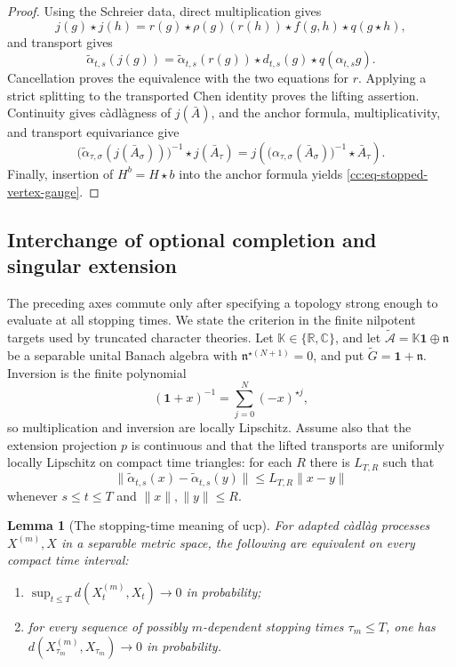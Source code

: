\documentclass[10pt,reqno]{amsart}
\theoremstyle{plain}
\newtheorem{lemma}[theorem]{Lemma}
\theoremstyle{definition}
\theoremstyle{remark}
\begin{document}
\begin{proof}
Using the Schreier data, direct multiplication gives
\[
 j(g)\star j(h)
 =r(g)\star\rho(g)(r(h))\star f(g,h)\star q(g\star h),
\]
and transport gives
\[
 \widetilde\alpha_{t,s}(j(g))
 =\widetilde\alpha_{t,s}(r(g))\star d_{t,s}(g)
  \star q(\alpha_{t,s}g).
\]
Cancellation proves the equivalence with the two equations for \(r\).
Applying a strict splitting to the transported Chen identity proves the
lifting assertion.  Continuity gives càdlàgness of \(j(\bar A)\), and
the anchor formula, multiplicativity, and transport equivariance give
\[
 \bigl(\widetilde\alpha_{\tau,\sigma}(j(\bar A_\sigma))\bigr)^{-1}
 \star j(\bar A_\tau)
 =j\!\left(
  \bigl(\alpha_{\tau,\sigma}(\bar A_\sigma)\bigr)^{-1}
  \star\bar A_\tau\right).
\]
Finally, insertion of \(H^b=H\star b\) into the anchor formula yields
\eqref{cc:eq-stopped-vertex-gauge}.
\end{proof}

\subsection{Interchange of optional completion and singular extension}

The preceding axes commute only after specifying a topology strong enough
to evaluate at all stopping times.  We state the criterion in the finite
nilpotent targets used by truncated character theories.  Let
\(\mathbb K\in\{\mathbb R,\mathbb C\}\), and let
\(\widetilde{\mathcal A}=\mathbb K{\mathbf 1}\oplus\mathfrak n\) be a separable unital Banach
algebra with \(\mathfrak n^{\star(N+1)}=0\), and put
\(\widetilde G={\mathbf 1}+\mathfrak n\).  Inversion is the finite polynomial
\begin{equation}
 ({\mathbf 1}+x)^{-1}=\sum_{j=0}^{N}(-x)^{\star j},
 \label{cc:eq-polynomial-inverse}
\end{equation}
so multiplication and inversion are locally Lipschitz.  Assume also that
the extension projection \(p\) is continuous and that the lifted
transports are uniformly locally Lipschitz on compact time
triangles: for each \(R\) there is \(L_{T,R}\) such that
\begin{equation}
 \|\widetilde\alpha_{t,s}(x)-\widetilde\alpha_{t,s}(y)\|
 \le L_{T,R}\|x-y\|
 \label{cc:eq-uniform-transport-Lipschitz}
\end{equation}
whenever \(s\le t\le T\) and \(\|x\|,\|y\|\le R\).

\begin{lemma}[The stopping-time meaning of ucp]
\label{cc:lem-ucp-characterization}
For adapted càdlàg processes \(X^{(m)},X\) in a separable metric space,
the following are equivalent on every compact time interval:
\begin{enumerate}[label=\textup{(\roman*)},leftmargin=2.8em]
\item \(\sup_{t\le T}d(X^{(m)}_t,X_t)\to0\) in probability;
\item for every sequence of possibly \(m\)-dependent stopping times
\(\tau_m\le T\), one has
\(d(X^{(m)}_{\tau_m},X_{\tau_m})\to0\) in probability.
\end{enumerate}
\end{lemma}
\end{document}
